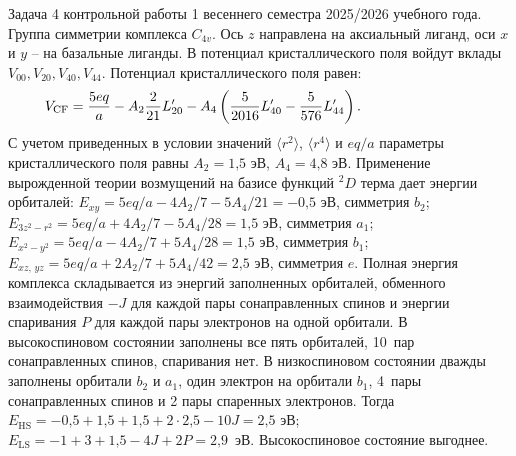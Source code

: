  Задача 4 контрольной работы 1 весеннего семестра 2025/2026 учебного года. Группа симметрии комплекса $C_{4v}$. Ось $z$ направлена на аксиальный лиганд, оси $x$ и $y$ – на базальные лиганды. В потенциал кристаллического поля войдут вклады $V_{00}\text{,}\,V_{20}\text{,}\,V_{40}\text{,}\,V_{44}$. Потенциал кристаллического поля равен:
\begin{equation*}
\begin{aligned}
& V_{\text{CF}}= \dfrac{5eq}{a} - A_2 \dfrac{2}{21}L_{20}' - A_4 \left( \dfrac{5}{2016}L_{40}'  - \dfrac{5}{576}L_{44}' \right). \hspace{25mm}
\end{aligned}
\end{equation*}
С учетом приведенных в условии значений $\langle r^2 \rangle$, $\langle r^4 \rangle$ и $eq/a$ параметры кристаллического поля равны $A_2 = \text{1,5}$ эВ, $A_4 = \text{4,8}$ эВ. Применение вырожденной теории возмущений на базисе функций $^2D$ терма дает энергии орбиталей: $E_{xy} = 5eq/a - {4A_2}/{7} - {5A_4}/{21}= -\text{0,5}$ эВ, симметрия $b_2$; $E_{3z^2-r^2} = 5eq/a + {4A_2}/{7} - {5A_4}/{28} = \text{1,5}$ эВ, симметрия $a_1$; $E_{x^2-y^2} = 5eq/a - {4A_2}/{7} + {5A_4}/{28}= \text{1,5}$ эВ, симметрия $b_1$; $E_{xz,\,yz} = 5eq/a + {2A_2}/{7} + {5A_4}/{42} = \text{2,5}$ эВ, симметрия $e$. Полная энергия комплекса складывается из энергий заполненных орбиталей, обменного взаимодействия $-J$ для каждой пары сонаправленных спинов и энергии спаривания $P$ для каждой пары электронов на одной орбитали. В высокоспиновом состоянии заполнены все пять орбиталей, 10~пар сонаправленных спинов, спаривания нет. В низкоспиновом состоянии дважды заполнены орбитали $b_2$ и $a_1$, один электрон на орбитали $b_1$, 4~пары сонаправленных спинов и 2 пары спаренных электронов. Тогда $E_{\text{HS}} = -\text{0,5} + \text{1,5}+\text{1,5} + 2\cdot\text{2,5} - 10J = \text{2,5}$ эВ; $E_{\text{LS}} = -1 + 3 + \text{1,5} - 4J + 2P = \text{2,9}$~эВ. Высокоспиновое состояние выгоднее.\par
\newpage


